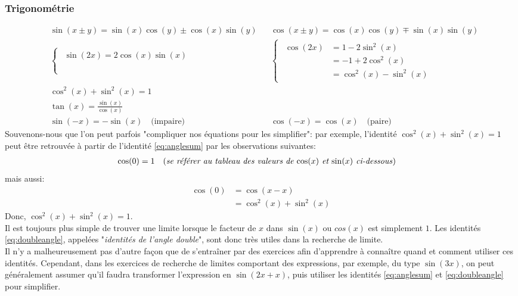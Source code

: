 \documentclass{article}
\numberwithin{equation}{section}
\begin{document}
\subsubsection{Trigonométrie}
\begin{align}
	\label{eq:anglesum}
	&\sin(x \pm y) 	= \sin(x) \cos(y) \pm \cos(x) \sin(y)	& &\cos(x \pm y) 	= \cos(x) \cos(y) \mp \sin(x)\sin(y) \\
	\label{eq:doubleangle}
	&\begin{cases}
		\begin{aligned}	
			\sin(2x) = 2\cos(x)\sin(x) \\ 
						\\ 
						\\
		\end{aligned} 
	\end{cases} & &\begin{cases}
		\begin{aligned}
			\cos(2x) 	&= 1 - 2\sin^2(x) \\
						&= -1 + 2\cos^2(x)  \\
						&= \cos^2(x) - \sin^2(x)
		\end{aligned}
	\end{cases} \\
	&\cos^2(x) + \sin^2(x) = 1 \\
	&\tan(x) = \frac{\sin(x)}{\cos(x)} \\
	&\sin(-x) = -\sin(x) \quad \text{(impaire)}		& &\cos(-x) = \cos(x) \quad \text{(paire)}
\end{align}
Souvenons-nous que l'on peut parfois "compliquer nos équations pour les simplifier": par exemple, l'identité \(\cos^2(x) + \sin^2(x) = 1\) peut être retrouvée à partir de l'identité \ref{eq:anglesum} par les observations suivantes: 
\vspace{-0.2cm}
\begin{align*}
	\cos(0) 	&= 1 \quad \text{(\emph{se référer au tableau des valeurs de \(\cos(x)\) et \(\sin(x)\) ci-dessous})}
\end{align*}
\vspace{-0.2cm}
mais aussi: 
\begin{align*}
	\cos(0)	&= \cos(x-x) \\
				&= \cos^2(x) + \sin^2(x) 
\end{align*}
Donc, \(\cos^2(x) + \sin^2(x) = 1\). \\
Il est toujours plus simple de trouver une limite lorsque le facteur de \(x\) dans \(\sin(x)\) ou \(cos(x)\) est simplement \(1\). Les identités \ref{eq:doubleangle}, appelées "\emph{identités de l'angle double}", sont donc très utiles dans la recherche de limite. \\
Il n'y a malheureusement pas d'autre façon que de s'entraîner par des exercices afin d'apprendre à connaître quand et comment utiliser ces identités. Cependant, dans les exercices de recherche de limites comportant des expressions, par exemple, du type \(\sin(3x)\), on peut généralement assumer qu'il faudra transformer l'expression en \(\sin(2x + x)\), puis utiliser les identités \ref{eq:anglesum} et \ref{eq:doubleangle} pour simplifier.
\end{document}
